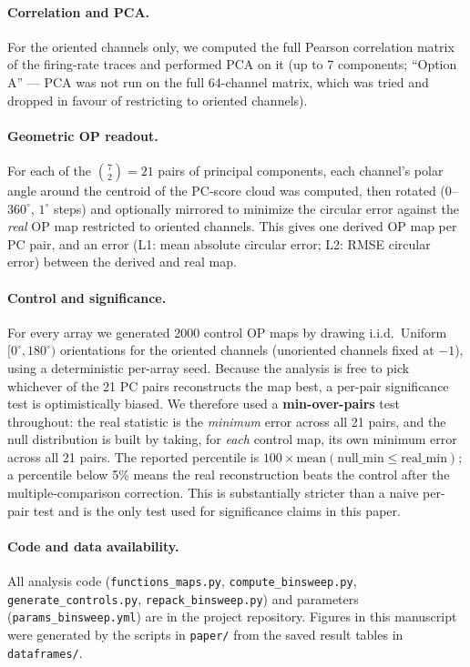 \documentclass[11pt]{article}
\begin{document}
\paragraph{Correlation and PCA.}
For the oriented channels only, we computed the full Pearson correlation
matrix of the firing-rate traces and performed PCA on it (up to 7
components; ``Option A'' --- PCA was not run on the full 64-channel matrix,
which was tried and dropped in favour of restricting to oriented channels).

\paragraph{Geometric OP readout.}
For each of the $\binom{7}{2} = 21$ pairs of principal components, each
channel's polar angle around the centroid of the PC-score cloud was
computed, then rotated ($0$--$360^\circ$, $1^\circ$ steps) and optionally
mirrored to minimize the circular error against the \emph{real} OP map
restricted to oriented channels. This gives one derived OP map per PC pair,
and an error (L1: mean absolute circular error; L2: RMSE circular error)
between the derived and real map.

\paragraph{Control and significance.}
For every array we generated 2000 control OP maps by drawing i.i.d.\
Uniform$[0^\circ, 180^\circ)$ orientations for the oriented channels
(unoriented channels fixed at $-1$), using a deterministic per-array seed.
Because the analysis is free to pick whichever of the 21 PC pairs
reconstructs the map best, a per-pair significance test is optimistically
biased. We therefore used a \textbf{min-over-pairs} test throughout: the
real statistic is the \emph{minimum} error across all 21 pairs, and the
null distribution is built by taking, for \emph{each} control map, its own
minimum error across all 21 pairs. The reported percentile is
$100 \times \text{mean}(\text{null\_min} \le \text{real\_min})$; a
percentile below 5\% means the real reconstruction beats the control after
the multiple-comparison correction. This is substantially stricter than a
naive per-pair test and is the only test used for significance claims in
this paper.

\paragraph{Code and data availability.}
All analysis code (\texttt{functions\_maps.py}, \texttt{compute\_binsweep.py},
\texttt{generate\_controls.py}, \texttt{repack\_binsweep.py}) and parameters
(\texttt{params\_binsweep.yml}) are in the project repository. Figures in
this manuscript were generated by the scripts in \texttt{paper/} from the
saved result tables in \texttt{dataframes/}.
\end{document}
